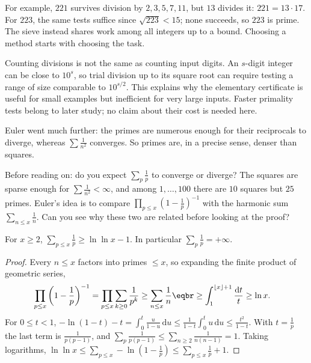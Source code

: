 For example, $221$ survives division by $2,3,5,7,11$, but $13$ divides it:
$221=13\cdot17$. For $223$, the same tests suffice since $\sqrt{223}<15$;
none succeeds, so $223$ is prime. The sieve instead shares work among all
integers up to a bound. Choosing a method starts with choosing the task.

Counting divisions is not the same as counting input digits. An $s$-digit
integer can be close to $10^s$, so trial division up to its square root
can require testing a range of size comparable to $10^{s/2}$. This explains
why the elementary certificate is useful for small examples but inefficient
for very large inputs. Faster primality tests belong to later study; no
claim about their cost is needed here.

Euler went much further: the primes are numerous enough for their reciprocals to diverge, whereas $\sum\frac1{n^2}$ converges. So primes are, in a precise sense, denser than squares.

\begin{think}
Before reading on: do you expect $\sum_p\frac1p$ to converge or diverge? The squares are sparse enough for $\sum\frac1{n^2}<\infty$, and among $1,\dots,100$ there are $10$ squares but $25$ primes. Euler's idea is to compare $\prod_{p\le x}(1-\frac1p)^{-1}$ with the harmonic sum $\sum_{n\le x}\frac1n$. Can you see why these two are related before looking at the proof?
\end{think}

\begin{theorem}[Euler]\label{thm:euler}
For $x\ge2$, $\displaystyle\sum_{p\le x}\frac1p\ge\ln\ln x-1$. In particular $\sum_p\frac1p=+\infty$.
\end{theorem}
\begin{proof}
Every $n\le x$ factors into primes $\le x$, so expanding the finite product of geometric series,
\[
\begin{aligned}\prod_{p\le x}\left(1-\frac1p\right)^{-1}&=\prod_{p\le x}\sum_{k\ge0}\frac1{p^k}\ge\sum_{n\le x}\frac1n\eqbr\ge\int_1^{\lfloor x\rfloor+1}\frac{\mathrm dt}t\ge\ln x.\end{aligned}
\]
For $0\le t<1$, $-\ln(1-t)-t=\int_0^t\frac u{1-u}\,\mathrm du\le\frac1{1-t}\int_0^t u\,\mathrm du\le\frac{t^2}{1-t}$. With $t=\frac1p$ the last term is $\frac1{p(p-1)}$, and $\sum_p\frac1{p(p-1)}\le\sum_{n\ge2}\frac1{n(n-1)}=1$. Taking logarithms,
$\ln\ln x\le\sum_{p\le x}-\ln\left(1-\frac1p\right)\le\sum_{p\le x}\frac1p+1$.
\end{proof}

